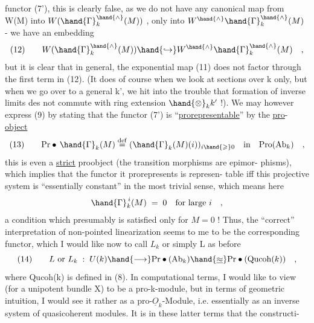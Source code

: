 functor (7'), this is clearly false, as we do not have any canonical
map from W(M) into $W(\hand{\Gamma}_k^{\hand{\wedge}}(M))$ , only into $W^{\hand{\wedge}}\hand{\Gamma}_k^{\hand{\wedge}}(M)$  - we have an
embedding
\[ (12) \qquad W(\hand{\Gamma}_k^{\hand{\wedge}}(M)) \hand{\hookrightarrow} W^{\hand{\wedge}}\hand{\Gamma}_k^{\hand{\wedge}}(M) \quad , \]
but it is clear that in general, the exponential map (11) does not
factor through the first term in (12). (It does of course when we look
at sections over k only, but when we go over to a general k', we hit
into the trouble that formation of inverse limits des not commute with
ring extension $\hand{\otimes}_k k'$ !). We may however express (9) by stating that the
functor (7') is ``\uline{prorepresentable}'' by the \uline{pro}-\uline{object}
\[ (13) \qquad \mathrm{Pr}\bullet\, \hand{\Gamma}_k(M) \overset{\mathrm{def}}{=} (\hand{\Gamma}_k(M)(i))_{i \hand{\geqslant} 0} \quad \text{in} \quad \mathrm{Pro}(\mathrm{Ab}_k) \quad , \]
this is even a \uline{strict} proobject (the transition morphisms are epimor-%
phisms), which implies that the functor it prorepresents is represen-%
table iff this projective system is ``essentially constant'' in the most
trivial sense, which means here
\[ \hand{\Gamma}_k^{\,i}(M) \;=\; 0 \quad \text{for large } i \quad , \]
a condition which presumably is satisfied only for $M=0$ ! Thus, the
``correct'' interpretation of non-pointed  linearization seems to me to
be the corresponding functor, which I would like now to call $L_k$ or
simply L as before 
\[ (14) \qquad L \text{ or } L_k \;:\; U(k) \hand{\longrightarrow} \mathrm{Pr}\bullet(\mathrm{Ab}_k) \hand{\underline{\approx}} \mathrm{Pr}\bullet(\mathrm{Qucoh}(k)) \quad , \]
where  Qucoh(k) is defined in (8). In computational terms, I
would like to view  (for a unipotent bundle X)  to be a
pro-k-module, but in terms of geometric intuition, I would see it
rather as a pro-$\underline{O}_k$-Module, i.e. essentially as an inverse system of
quasicoherent modules. It is in these latter terms that the constructi-%
